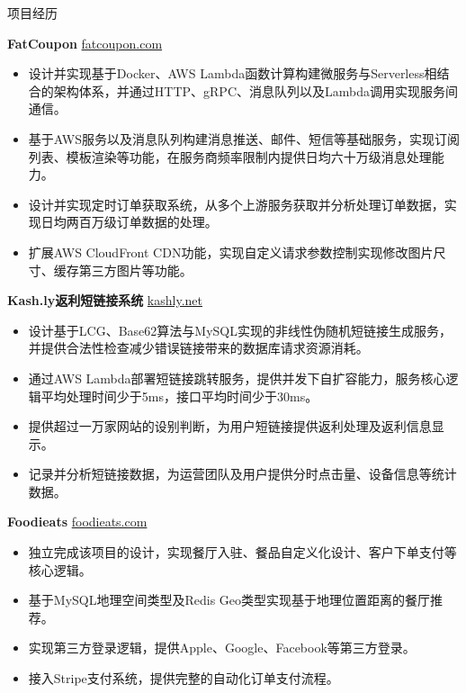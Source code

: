 \documentclass{resume} %
\begin{document}
\begin{rSection}{项目经历}
  \vspace{-1.25em}
  
  \item \textbf{FatCoupon} {} \hfill \href{www.fatcoupon.com}{fatcoupon.com}
  \begin{itemize}
    \itemsep -3pt {}
    \item 设计并实现基于Docker、AWS Lambda函数计算构建微服务与Serverless相结合的架构体系，并通过HTTP、gRPC、消息队列以及Lambda调用实现服务间通信。
    \item 基于AWS服务以及消息队列构建消息推送、邮件、短信等基础服务，实现订阅列表、模板渲染等功能，在服务商频率限制内提供日均六十万级消息处理能力。
    \item 设计并实现定时订单获取系统，从多个上游服务获取并分析处理订单数据，实现日均两百万级订单数据的处理。
    \item 扩展AWS CloudFront CDN功能，实现自定义请求参数控制实现修改图片尺寸、缓存第三方图片等功能。
  \end{itemize}
  
  \item \textbf{Kash.ly返利短链接系统} {} \hfill \href{kashly.net}{kashly.net}
  \begin{itemize}
    \itemsep -3pt {}
    \item 设计基于LCG、Base62算法与MySQL实现的非线性伪随机短链接生成服务，并提供合法性检查减少错误链接带来的数据库请求资源消耗。
    \item 通过AWS Lambda部署短链接跳转服务，提供并发下自扩容能力，服务核心逻辑平均处理时间少于5ms，接口平均时间少于30ms。
    \item 提供超过一万家网站的设别判断，为用户短链接提供返利处理及返利信息显示。
    \item 记录并分析短链接数据，为运营团队及用户提供分时点击量、设备信息等统计数据。
  \end{itemize}
  
  \item \textbf{Foodieats} {} \hfill \href{foodieats.com}{foodieats.com}
  \begin{itemize}
    \itemsep -3pt {}
    \item 独立完成该项目的设计，实现餐厅入驻、餐品自定义化设计、客户下单支付等核心逻辑。
    \item 基于MySQL地理空间类型及Redis Geo类型实现基于地理位置距离的餐厅推荐。
    \item 实现第三方登录逻辑，提供Apple、Google、Facebook等第三方登录。
    \item 接入Stripe支付系统，提供完整的自动化订单支付流程。
  \end{itemize}
  

\end{rSection}
\end{document}
